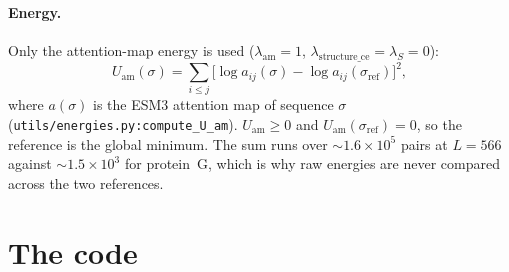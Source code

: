 \documentclass[11pt,a4paper]{article}
\newcommand{\Uam}{U_{\mathrm{am}}}
\newcommand{\file}[1]{\texttt{#1}}
\begin{document}
\paragraph{Energy.} Only the attention-map energy is used
($\lambda_{\mathrm{am}}=1$, $\lambda_{\mathrm{structure\_ce}}=\lambda_S=0$):
\begin{equation}
  \Uam(\sigma) = \sum_{i\le j}\bigl[\log a_{ij}(\sigma) - \log a_{ij}(\sigma_{\mathrm{ref}})\bigr]^2 ,
\end{equation}
where $a(\sigma)$ is the ESM3 attention map of sequence $\sigma$
(\file{utils/energies.py:compute\_U\_am}). $\Uam\ge 0$ and
$\Uam(\sigma_{\mathrm{ref}})=0$, so the reference is the global minimum. The sum
runs over $\sim\!1.6\times10^5$ pairs at $L=566$ against $\sim\!1.5\times10^3$ for
protein~G, which is why raw energies are never compared across the two
references.

\section{The code}
\end{document}
